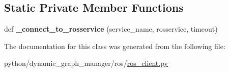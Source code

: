 \subsection*{Static Private Member Functions}
\begin{DoxyCompactItemize}
\item 
\mbox{\label{classros_1_1ros__client_1_1RosPythonInterpreter_a8a6ff47e74db5c036872d3628957c9d0}} 
def {\bfseries \+\_\+connect\+\_\+to\+\_\+rosservice} (service\+\_\+name, rosservice, timeout)
\end{DoxyCompactItemize}


The documentation for this class was generated from the following file\+:\begin{DoxyCompactItemize}
\item 
python/dynamic\+\_\+graph\+\_\+manager/ros/\hyperlink{ros__client_8py}{ros\+\_\+client.\+py}\end{DoxyCompactItemize}

